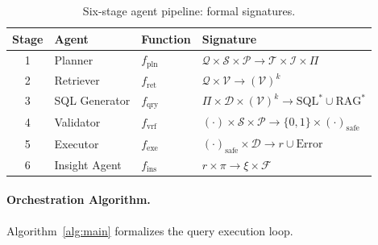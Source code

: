 \documentclass[11pt,a4paper]{article}
\begin{document}
\begin{table}[htbp]
\centering
\caption{Six-stage agent pipeline: formal signatures.}
\label{tab:agents}
\small
\begin{tabular}{cllp{5.5cm}}
\toprule
\textbf{Stage} & \textbf{Agent} & \textbf{Function} & \textbf{Signature} \\
\midrule
1 & Planner       & $f_\mathrm{pln}$ & $\mathcal{Q} \times \mathcal{S} \times \mathcal{P} \to \mathcal{T} \times \mathcal{I} \times \Pi$ \\
2 & Retriever     & $f_\mathrm{ret}$ & $\mathcal{Q} \times \mathcal{V} \to (\mathcal{V})^k$ \\
3 & SQL Generator & $f_\mathrm{qry}$ & $\Pi \times \mathcal{D} \times (\mathcal{V})^k \to \text{SQL}^* \cup \text{RAG}^*$ \\
4 & Validator     & $f_\mathrm{vrf}$ & $(\cdot) \times \mathcal{S} \times \mathcal{P} \to \{0,1\} \times (\cdot)_\mathrm{safe}$ \\
5 & Executor      & $f_\mathrm{exe}$ & $(\cdot)_\mathrm{safe} \times \mathcal{D} \to r \cup \text{Error}$ \\
6 & Insight Agent & $f_\mathrm{ins}$ & $r \times \pi \to \xi \times \mathcal{F}$ \\
\bottomrule
\end{tabular}
\end{table}

\paragraph{Orchestration Algorithm.}
Algorithm~\ref{alg:main} formalizes the query execution loop.
\end{document}
